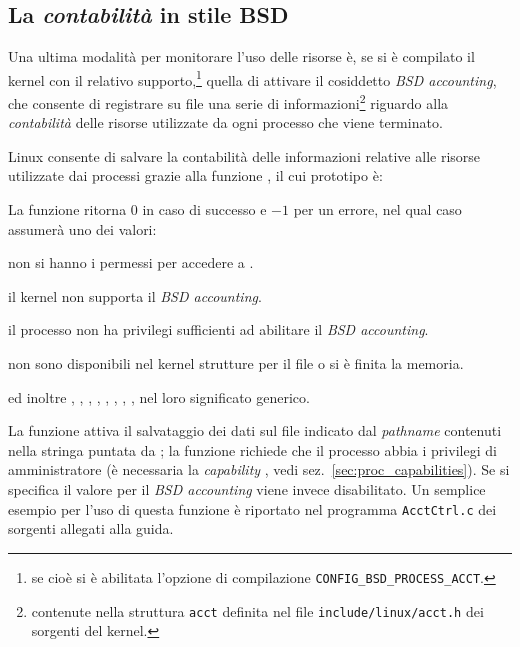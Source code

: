 \subsection{La \textsl{contabilità} in stile BSD}
\label{sec:sys_bsd_accounting}

Una ultima modalità per monitorare l'uso delle risorse è, se si è compilato il
kernel con il relativo supporto,\footnote{se cioè si è abilitata l'opzione di
  compilazione \texttt{CONFIG\_BSD\_PROCESS\_ACCT}.} quella di attivare il
cosiddetto \textit{BSD accounting}, che consente di registrare su file una
serie di informazioni\footnote{contenute nella struttura \texttt{acct}
  definita nel file \texttt{include/linux/acct.h} dei sorgenti del kernel.}
riguardo alla \textsl{contabilità} delle risorse utilizzate da ogni processo
che viene terminato.

Linux consente di salvare la contabilità delle informazioni relative alle
risorse utilizzate dai processi grazie alla funzione , il cui
prototipo è:

\begin{funcproto}{
}

{La funzione ritorna $0$ in caso di successo e $-1$ per un errore, nel qual
  caso  assumerà uno dei valori: 
  \begin{errlist}
    \item[\errcode{EACCES}] non si hanno i permessi per accedere a
      .
    \item[\errcode{ENOSYS}] il kernel non supporta il \textit{BSD accounting}.
    \item[\errcode{EPERM}] il processo non ha privilegi sufficienti ad
      abilitare il \textit{BSD accounting}.
    \item[\errcode{EUSERS}] non sono disponibili nel kernel strutture per il
      file o si è finita la memoria.
    \end{errlist}
    ed inoltre , , ,
    , , , ,
    ,  nel loro significato generico.}
\end{funcproto}

La funzione attiva il salvataggio dei dati sul file indicato dal
\textit{pathname} contenuti nella stringa puntata da ; la
funzione richiede che il processo abbia i privilegi di amministratore (è
necessaria la \textit{capability} , vedi
sez.~\ref{sec:proc_capabilities}). Se si specifica il valore  per
 il \textit{BSD accounting} viene invece disabilitato. Un
semplice esempio per l'uso di questa funzione è riportato nel programma
\texttt{AcctCtrl.c} dei sorgenti allegati alla guida.

